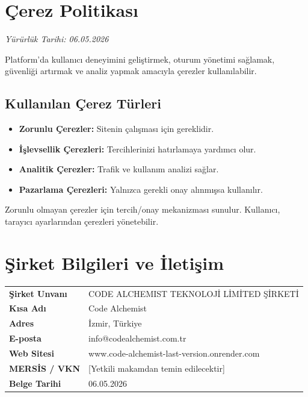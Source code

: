 \documentclass[12pt,a4paper]{article}
\begin{document}
\section{\c{C}erez Politikas{\i}}
\textit{Y\"{u}r\"{u}rl\"{u}k Tarihi: 06.05.2026}

Platform'da kullan{\i}c{\i} deneyimini geli\c{s}tirmek, oturum y\"{o}netimi sa\u{g}lamak, g\"{u}venli\u{g}i
art{\i}rmak ve analiz yapmak amac{\i}yla \c{c}erezler kullan{\i}labilir.

\subsection*{Kullan{\i}lan \c{C}erez T\"{u}rleri}
\begin{itemize}
  \item \textbf{Zorunlu \c{C}erezler:} Sitenin \c{c}al{\i}\c{s}mas{\i} i\c{c}in gereklidir.
  \item \textbf{\.{I}\c{s}levsellik \c{C}erezleri:} Tercihlerinizi hat{\i}rlamaya yard{\i}mc{\i} olur.
  \item \textbf{Analitik \c{C}erezler:} Trafik ve kullan{\i}m analizi sa\u{g}lar.
  \item \textbf{Pazarlama \c{C}erezleri:} Yaln{\i}zca gerekli onay al{\i}nm{\i}\c{s}sa kullan{\i}l{\i}r.
\end{itemize}

Zorunlu olmayan \c{c}erezler i\c{c}in tercih/onay mekanizmas{\i} sunulur. Kullan{\i}c{\i}, taray{\i}c{\i}
ayarlar{\i}ndan \c{c}erezleri y\"{o}netebilir.

\section{\c{S}irket Bilgileri ve \.{I}leti\c{s}im}
\begin{center}
\begin{tabular}{|l|l|}
\hline
\textbf{\c{S}irket Unvan{\i}}       & CODE ALCHEMIST TEKNOLOJ\.{I} L\.{I}M\.{I}TED \c{S}\.{I}RKET\.{I} \\
\textbf{K{\i}sa Ad{\i}}             & Code Alchemist \\
\textbf{Adres}                       & \.{I}zmir, T\"{u}rkiye \\
\textbf{E-posta}                     & info@codealchemist.com.tr \\
\textbf{Web Sitesi}                  & www.code-alchemist-last-version.onrender.com \\
\textbf{MERS\.{I}S / VKN}           & [Yetkili makamdan temin edilecektir] \\
\textbf{Belge Tarihi}                & 06.05.2026 \\
\hline
\end{tabular}
\end{center}
\end{document}
